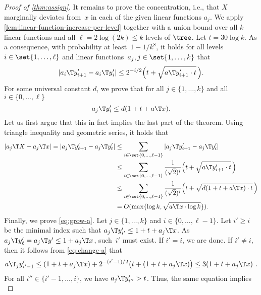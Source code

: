 \begin{proof}[Proof of \cref{thm:assign}]
    It remains to prove the concentration, i.e., that $X$ marginally deviates from~$x$ in each of the
    given linear functions $a_j$.
    We apply \cref{lem:linear-function-increase-per-level} together with a union bound over all $k$ linear functions and all $\ell = 2\log(2k) \le k$ levels of $\tree$.
    Let $t = 30\log k$.
    As a consequence, with probability at least~$1 - 1/k^8$, it holds for all levels~$i \in \set{1, \dotsc , \ell}$ and linear functions~$a_j,j\in\set{1,\dotsc,k}$ that
    \begin{equation}\label{eq:change-a}
        |a_i\T y_{i+1}' - a_i\T y_i'| \le 2^{-i/2} \Big(t + \sqrt{a\T y_{i+1}' \cdot t}\,\Big).
    \end{equation}
    For some universal constant $d$, we prove that for all $j\in\{1,\dotsc,k\}$ and all~$i\in\{0,\dotsc,\ell\}$
    \begin{equation}\label{eq:grow-a}
        a_j\T y'_i \le d (1 + t + a\T x).
    \end{equation}
    Let us first argue that this in fact implies the last part of the theorem.
    Using triangle inequality and geometric series, it holds that
    \begin{align*}
        |a_j\T X - a_j\T x| 
        = |a_j\T y'_{\ell+1} - a_j\T y'_{\ell}| 
        &\le \sum_{i \in \set{0, \dotsc, \ell-1}} |a_j\T y'_{i+1} - a_j\T y'_{i}| \\
        &\le \sum_{i \in \set{0, \dotsc, \ell-1}} \frac{1}{(\sqrt{2})^i} \Big(t + \sqrt{a\T y'_{i+1} \cdot t}\,\Big) \\
        &\le \sum_{i \in \set{0, \dotsc, \ell-1}} \frac{1}{(\sqrt{2})^i} \Big(t + \sqrt{d(1 + t + a\T x) \cdot t}\,\Big) \\
        &= O(\max\{\log k, \sqrt{a\T x \cdot \log k}\}) .
    \end{align*}
    Finally, we prove \cref{eq:grow-a}.
    Let $j\in\{1,\dotsc,k\}$
    and $i\in\{0,\dotsc,\ell-1\}$.
    Let $i' \ge i$ be the minimal index such that
    $a_j\T y'_{i'} \le 1 + t + a_j\T x$.
    As $a_j\T y'_{\ell} = a_j\T y' \le 1 + a_j\T x$, such~$i'$ must exist.
    If $i' = i$, we are done. If $i' \neq i$, then it follows from \cref{eq:change-a} that
    \begin{equation*}
        a\T_j y'_{i'-1} \le (1 + t + a_j\T x) + 2^{-(i'-1)/2}\big(t + (1 + t + a_j\T x)\big) \le 3(1 + t + a_j\T x) \ .
    \end{equation*}
    For all $i'' \in\{i'-1,\dotsc,i\}$, we have $a_j\T y'_{i''} > t$. Thus, the same equation implies
    \begin{equation*}

\end{equation*}
\end{proof}
